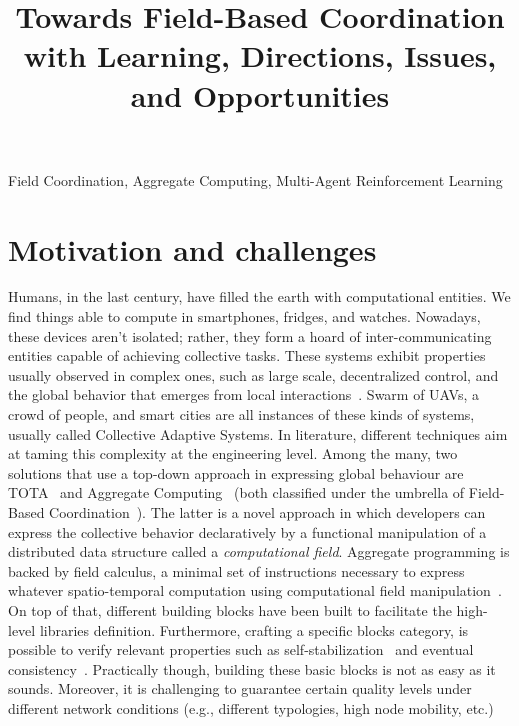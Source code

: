 \documentclass[conference]{IEEEtran}
\begin{document}
\title{Towards Field-Based Coordination with Learning, Directions, Issues, and Opportunities}

\author{
\and
{}
}

\maketitle

\begin{IEEEkeywords}
Field Coordination, Aggregate Computing, Multi-Agent Reinforcement Learning
\end{IEEEkeywords}

\section{Motivation and challenges}
Humans, in the last century, have filled the earth with computational entities. 
%
We find things able to compute in smartphones, fridges, and watches. %
Nowadays, these devices aren't isolated; rather, they form a hoard of inter-communicating entities capable of achieving collective tasks. 
These systems exhibit properties usually observed in complex ones, such as large scale, 
decentralized control, and the global behavior that emerges from local interactions~\cite{DBLP:conf/huc/Ferscha15}. 
Swarm of UAVs, a crowd of people, and smart cities are all instances of these kinds of systems, usually called Collective Adaptive Systems.
%
In literature, different techniques aim at taming this complexity at the engineering level.
Among the many, two solutions that use a top-down approach in expressing global behaviour are TOTA~\cite{DBLP:journals/tosem/MameiZ09} and Aggregate Computing~\cite{DBLP:journals/computer/BealPV15} (both classified under the umbrella of Field-Based Coordination~\cite{DBLP:books/daglib/0015276}).
The latter is a novel approach in which developers can express the collective behavior declaratively by
a functional manipulation of a distributed data structure called a \emph{computational field}.
Aggregate programming is backed by field calculus, a minimal set of instructions necessary to express whatever spatio-temporal computation using computational field manipulation~\cite{DBLP:conf/coordination/AudritoBDV18}. 
On top of that, different building blocks have been built to facilitate the high-level libraries definition.
Furthermore, crafting a specific blocks category, is possible to verify relevant properties such as self-stabilization~\cite{DBLP:conf/coordination/ViroliD14} and eventual consistency~\cite{DBLP:conf/saso/BealVPD16}.
Practically though, building these basic blocks is not as easy as it sounds. 
Moreover, it is challenging to guarantee certain quality levels under different network conditions (e.g., different typologies, high node mobility, etc.)
\end{document}
